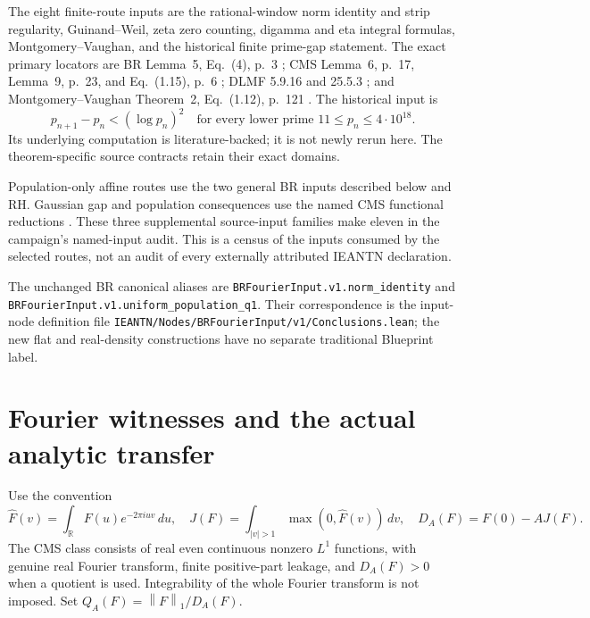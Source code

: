 \documentclass[11pt]{article}
\newcommand{\RR}{\mathbb R}
\newcommand{\norm}[1]{\left\lVert#1\right\rVert}
\begin{document}
The eight finite-route inputs are the rational-window norm identity and strip
regularity, Guinand--Weil, zeta zero counting, digamma and eta integral formulas,
Montgomery--Vaughan, and the historical finite prime-gap statement.
The exact primary locators are BR Lemma~5, Eq.~(4), p.~3 \cite{BR};
CMS Lemma~6, p.~17, Lemma~9, p.~23, and Eq.~(1.15), p.~6 \cite{CMS};
DLMF 5.9.16 and 25.5.3 \cite{DLMF}; and Montgomery--Vaughan
Theorem~2, Eq.~(1.12), p.~121 \cite{MV}.
The historical input is
\[
 p_{n+1}-p_n<(\log p_n)^2
 \quad\text{for every lower prime }11\le p_n\le4\cdot10^{18}.
 \tag{3}\label{eq:3}
\]
Its underlying computation is literature-backed; it is not newly rerun here.
The theorem-specific source contracts retain their exact domains.

Population-only affine routes use the two general BR inputs described below
and RH. Gaussian gap and population consequences use the named CMS functional
reductions \cite[Theorem~3, Eq.~(1.13), and Corollary~4, Eq.~(1.14)]{CMS}.
These three supplemental source-input families make eleven in the campaign's
named-input audit. This is a census of the inputs consumed by the selected
routes, not an audit of every externally attributed IEANTN declaration.
\par\begingroup\raggedright
The unchanged BR canonical aliases are
\nolinkurl{BRFourierInput.v1.norm_identity} and
\nolinkurl{BRFourierInput.v1.uniform_population_q1}.
Their correspondence is the input-node definition file
\nolinkurl{IEANTN/Nodes/BRFourierInput/v1/Conclusions.lean}; the new flat
and real-density constructions have no separate traditional Blueprint label.
\par\endgroup

\section{Fourier witnesses and the actual analytic transfer}
Use the convention
\[
 \widehat F(v)=\int_{\RR}F(u)e^{-2\pi iuv}\,du,\quad
 J(F)=\int_{|v|>1}\max(0,\widehat F(v))\,dv,\quad
 D_A(F)=F(0)-AJ(F).
\]
The CMS class consists of real even continuous nonzero \(L^1\) functions,
with genuine real Fourier transform, finite positive-part leakage, and
\(D_A(F)>0\) when a quotient is used. Integrability of the whole Fourier
transform is not imposed. Set \(Q_A(F)=\norm F_1/D_A(F)\).
\end{document}
